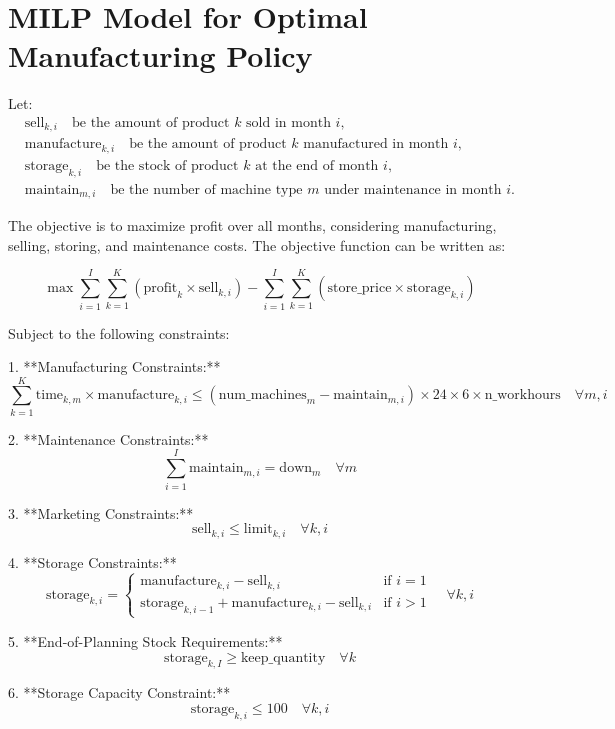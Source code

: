 \documentclass{article}
\begin{document}
\section*{MILP Model for Optimal Manufacturing Policy}

Let:
\begin{align*}
& \text{sell}_{k,i} \quad \text{be the amount of product } k \text{ sold in month } i, \\
& \text{manufacture}_{k,i} \quad \text{be the amount of product } k \text{ manufactured in month } i, \\
& \text{storage}_{k,i} \quad \text{be the stock of product } k \text{ at the end of month } i, \\
& \text{maintain}_{m,i} \quad \text{be the number of machine type } m \text{ under maintenance in month } i.
\end{align*}

The objective is to maximize profit over all months, considering manufacturing, selling, storing, and maintenance costs. The objective function can be written as:

\begin{equation}
\max \sum_{i=1}^{I} \sum_{k=1}^{K} \left( \text{profit}_k \times \text{sell}_{k,i} \right) - \sum_{i=1}^{I} \sum_{k=1}^{K} \left( \text{store\_price} \times \text{storage}_{k,i} \right)
\end{equation}

Subject to the following constraints:

1. **Manufacturing Constraints:**
   \begin{equation}
   \sum_{k=1}^{K} \text{time}_{k,m} \times \text{manufacture}_{k,i} \leq \left(\text{num\_machines}_m - \text{maintain}_{m,i}\right) \times 24 \times 6 \times \text{n\_workhours} \quad \forall m, i
   \end{equation}

2. **Maintenance Constraints:**
   \begin{equation}
   \sum_{i=1}^{I} \text{maintain}_{m,i} = \text{down}_{m} \quad \forall m
   \end{equation}

3. **Marketing Constraints:**
   \begin{equation}
   \text{sell}_{k,i} \leq \text{limit}_{k,i} \quad \forall k, i
   \end{equation}

4. **Storage Constraints:**
   \begin{equation}
   \text{storage}_{k,i} = \begin{cases} 
   \text{manufacture}_{k,i} - \text{sell}_{k,i} & \text{if } i = 1\\
   \text{storage}_{k,i-1} + \text{manufacture}_{k,i} - \text{sell}_{k,i} & \text{if } i > 1
   \end{cases} \quad \forall k, i
   \end{equation}

5. **End-of-Planning Stock Requirements:**
   \begin{equation}
   \text{storage}_{k,I} \geq \text{keep\_quantity} \quad \forall k
   \end{equation}

6. **Storage Capacity Constraint:**
   \begin{equation}
   \text{storage}_{k,i} \leq 100 \quad \forall k, i
   \end{equation}
\end{document}
